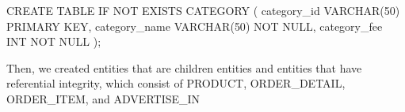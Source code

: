 \documentclass[
  letterpaper,
  DIV=11,
  numbers=noendperiod]{scrartcl}
\newenvironment{Shaded}{\begin{snugshade}}{\end{snugshade}}
\newcommand{\ControlFlowTok}[1]{\textcolor[rgb]{0.00,0.23,0.31}{#1}}
\newcommand{\DataTypeTok}[1]{\textcolor[rgb]{0.68,0.00,0.00}{#1}}
\newcommand{\DecValTok}[1]{\textcolor[rgb]{0.68,0.00,0.00}{#1}}
\newcommand{\KeywordTok}[1]{\textcolor[rgb]{0.00,0.23,0.31}{#1}}
\newcommand{\NormalTok}[1]{\textcolor[rgb]{0.00,0.23,0.31}{#1}}
\begin{document}
\begin{enumerate}
\begin{Shaded}
\begin{Highlighting}[]
\KeywordTok{CREATE} \KeywordTok{TABLE} \ControlFlowTok{IF} \KeywordTok{NOT} \KeywordTok{EXISTS} \KeywordTok{CATEGORY}\NormalTok{ (}
\NormalTok{  category\_id }\DataTypeTok{VARCHAR}\NormalTok{(}\DecValTok{50}\NormalTok{) }\KeywordTok{PRIMARY} \KeywordTok{KEY}\NormalTok{, }
\NormalTok{  category\_name }\DataTypeTok{VARCHAR}\NormalTok{(}\DecValTok{50}\NormalTok{) }\KeywordTok{NOT} \KeywordTok{NULL}\NormalTok{,}
\NormalTok{  category\_fee }\DataTypeTok{INT} \KeywordTok{NOT} \KeywordTok{NULL}
\NormalTok{);}
\end{Highlighting}
\end{Shaded}
\end{enumerate}

Then, we created entities that are children entities and entities that
have referential integrity, which consist of PRODUCT, ORDER\_DETAIL,
ORDER\_ITEM, and ADVERTISE\_IN
\end{document}

